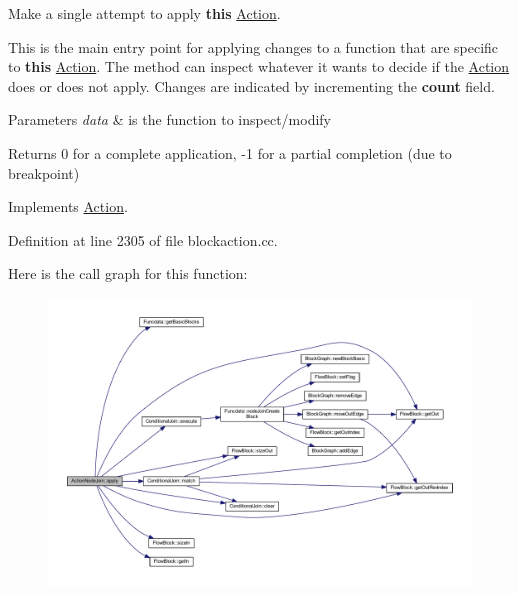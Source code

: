Make a single attempt to apply {\bfseries{this}} \mbox{\hyperlink{class_action}{Action}}. 

This is the main entry point for applying changes to a function that are specific to {\bfseries{this}} \mbox{\hyperlink{class_action}{Action}}. The method can inspect whatever it wants to decide if the \mbox{\hyperlink{class_action}{Action}} does or does not apply. Changes are indicated by incrementing the {\bfseries{count}} field. 
\begin{DoxyParams}{Parameters}
{\em data} & is the function to inspect/modify \\
\hline
\end{DoxyParams}
\begin{DoxyReturn}{Returns}
0 for a complete application, -\/1 for a partial completion (due to breakpoint) 
\end{DoxyReturn}


Implements \mbox{\hyperlink{class_action_aac1c3999d6c685b15f5d9765a4d04173}{Action}}.



Definition at line 2305 of file blockaction.\+cc.

Here is the call graph for this function\+:
\nopagebreak
\begin{figure}[H]
\begin{center}
\leavevmode
\includegraphics[width=350pt]{class_action_node_join_a1be9f170c96721c2f8770fc04b1f41df_cgraph}
\end{center}
\end{figure}
\mbox{\label{class_action_node_join_a51276a131d48cca6feead5edad6cc3d4}} 
